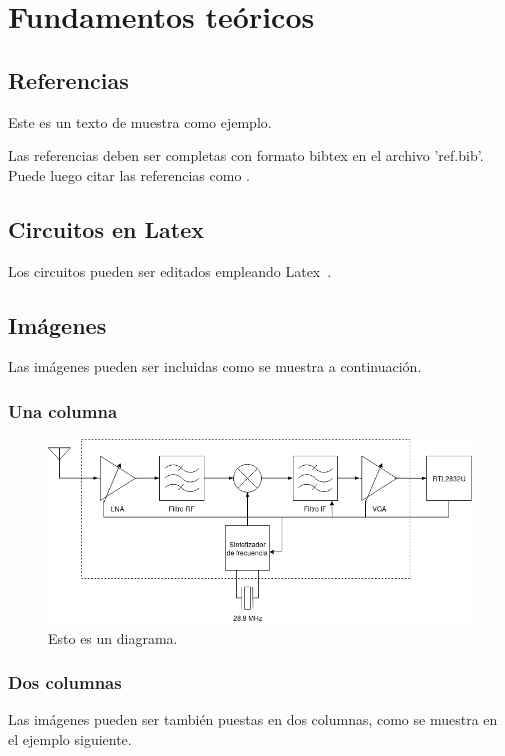 \section{Fundamentos teóricos}

\subsection{Referencias}
Este es un texto de muestra como ejemplo.

Las referencias deben ser completas con formato bibtex en el archivo 'ref.bib'.
Puede luego citar las referencias como \cite{ex}.

\subsection{Circuitos en Latex}

Los circuitos pueden ser editados empleando Latex~.




\subsection{Imágenes}
Las imágenes pueden ser incluidas como se muestra a continuación.

\subsubsection{Una columna}
\begin{figure}[ht]
	\centering
	\includegraphics[width=0.8\linewidth]{fig/frontend.png}
	\caption{Esto es un diagrama.}
	\label{fig:diagrama}
\end{figure}


\subsubsection{Dos columnas}
Las imágenes pueden ser también puestas en dos columnas, como se muestra en el ejemplo siguiente.

